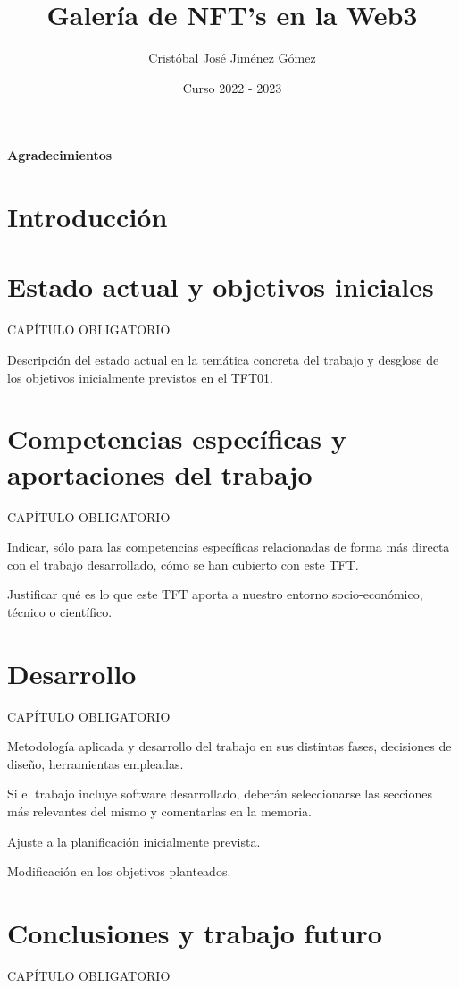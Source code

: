 \documentclass[oneside,12pt]{book}
\title{Galería de NFT's en la Web3}
\author{Cristóbal José Jiménez Gómez}
\date{Curso 2022 - 2023}
\begin{document}


%

\newpage
{}
{\Large{\textbf{Agradecimientos}}}


\clearpage

\tableofcontents
\listoffigures
\listoftables
\lstlistoflistings

\clearpage
{}

\chapter{Introducción}


%
\chapter{Estado actual y objetivos iniciales}

CAPÍTULO OBLIGATORIO

Descripción del estado actual en la temática concreta del trabajo y desglose de los objetivos inicialmente previstos en el TFT01.

\chapter{Competencias específicas y aportaciones del trabajo}
%
CAPÍTULO OBLIGATORIO

Indicar, sólo para las competencias específicas relacionadas de forma más directa con el trabajo desarrollado, cómo se han cubierto con este TFT.

Justificar qué es lo que este TFT aporta a nuestro entorno socio-económico, técnico o científico.

\chapter{Desarrollo}
%
CAPÍTULO OBLIGATORIO

Metodología aplicada y desarrollo del trabajo en sus distintas fases, decisiones de diseño, herramientas empleadas.

Si el trabajo incluye software desarrollado, deberán seleccionarse las secciones más relevantes del mismo y comentarlas en la memoria.

Ajuste a la planificación inicialmente prevista.

Modificación en los objetivos planteados.

\chapter{Conclusiones y trabajo futuro}
%
CAPÍTULO OBLIGATORIO
\end{document}

